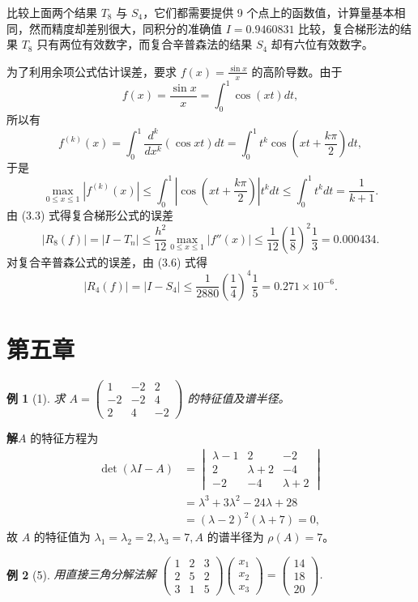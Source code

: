 \documentclass[a4paper,12pt]{ctexart}
\theoremstyle{exampleStyle}
\newtheorem*{example}{例}
\newcommand{\solution}{\par\noindent\textbf{解}\quad}
\begin{document}
比较上面两个结果 $T_8$ 与 $S_4$，它们都需要提供 9 个点上的函数值，计算量基本相同，然而精度却差别很大，同积分的准确值 $I = 0.9460831$ 比较，复合梯形法的结果 $T_8$ 只有两位有效数字，而复合辛普森法的结果 $S_4$ 却有六位有效数字。

为了利用余项公式估计误差，要求 $f(x) = \frac{\sin x}{x}$ 的高阶导数。由于
\[
f(x) = \frac{\sin x}{x} = \int_0^1 \cos(xt) dt,
\]
所以有
\[
f^{(k)}(x) = \int_0^1 \frac{d^k}{dx^k} (\cos xt) dt = \int_0^1 t^k \cos \left( xt + \frac{k\pi}{2} \right) dt,
\]
于是
\[
\max_{0 \leqslant x \leqslant 1} |f^{(k)}(x)| \leqslant \int_0^1 \left| \cos \left( xt + \frac{k\pi}{2} \right) \right| t^k dt \leqslant \int_0^1 t^k dt = \frac{1}{k+1}.
\]
由 (3.3) 式得复合梯形公式的误差
\[
|R_8(f)| = |I - T_n| \leqslant \frac{h^2}{12} \max_{0 \leqslant x \leqslant 1} |f''(x)| \leqslant \frac{1}{12} \left( \frac{1}{8} \right)^2 \frac{1}{3} = 0.000434.
\]
对复合辛普森公式的误差，由 (3.6) 式得
\[
|R_4(f)| = |I - S_4| \leqslant \frac{1}{2880} \left( \frac{1}{4} \right)^4 \frac{1}{5} = 0.271 \times 10^{-6}.
\]

\section*{第五章}

\begin{example}[1]
求 $A = \begin{pmatrix} 1 & -2 & 2 \\ -2 & -2 & 4 \\ 2 & 4 & -2 \end{pmatrix}$ 的特征值及谱半径。
\end{example}

\solution $A$ 的特征方程为
\begin{align*}
\det(\lambda I - A) &= \begin{vmatrix} \lambda - 1 & 2 & -2 \\ 2 & \lambda + 2 & -4 \\ -2 & -4 & \lambda + 2 \end{vmatrix} \\
&= \lambda^3 + 3\lambda^2 - 24\lambda + 28 \\
&= (\lambda - 2)^2 (\lambda + 7) = 0,
\end{align*}
故 $A$ 的特征值为 $\lambda_1 = \lambda_2 = 2, \lambda_3 = 7, A$ 的谱半径为 $\rho(A) = 7$。

\begin{example}[5]
用直接三角分解法解
$\begin{pmatrix} 1 & 2 & 3 \\ 2 & 5 & 2 \\ 3 & 1 & 5 \end{pmatrix} \begin{pmatrix} x_1 \\ x_2 \\ x_3 \end{pmatrix} = \begin{pmatrix} 14 \\ 18 \\ 20 \end{pmatrix}$.
\end{example}
\end{document}
